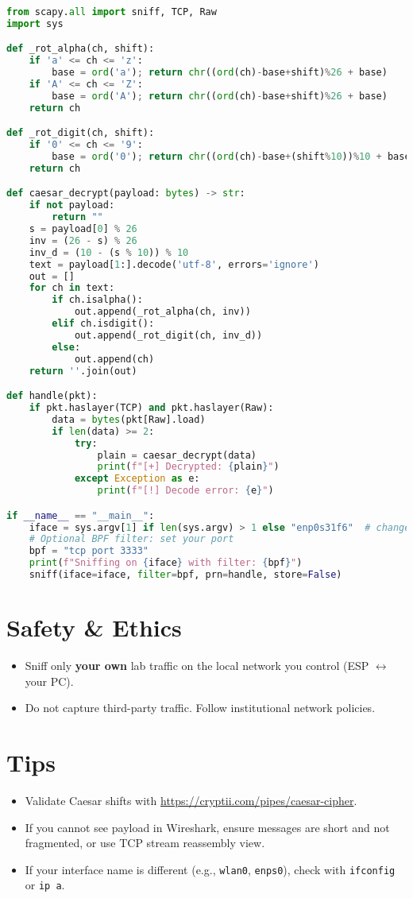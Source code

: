 \documentclass[11pt]{article}
\begin{document}
\begin{lstlisting}[language=Python, caption={sniff_caesar.py (Scapy)}]
from scapy.all import sniff, TCP, Raw
import sys

def _rot_alpha(ch, shift):
    if 'a' <= ch <= 'z':
        base = ord('a'); return chr((ord(ch)-base+shift)%26 + base)
    if 'A' <= ch <= 'Z':
        base = ord('A'); return chr((ord(ch)-base+shift)%26 + base)
    return ch

def _rot_digit(ch, shift):
    if '0' <= ch <= '9':
        base = ord('0'); return chr((ord(ch)-base+(shift%10))%10 + base)
    return ch

def caesar_decrypt(payload: bytes) -> str:
    if not payload:
        return ""
    s = payload[0] % 26
    inv = (26 - s) % 26
    inv_d = (10 - (s % 10)) % 10
    text = payload[1:].decode('utf-8', errors='ignore')
    out = []
    for ch in text:
        if ch.isalpha():
            out.append(_rot_alpha(ch, inv))
        elif ch.isdigit():
            out.append(_rot_digit(ch, inv_d))
        else:
            out.append(ch)
    return ''.join(out)

def handle(pkt):
    if pkt.haslayer(TCP) and pkt.haslayer(Raw):
        data = bytes(pkt[Raw].load)
        if len(data) >= 2:
            try:
                plain = caesar_decrypt(data)
                print(f"[+] Decrypted: {plain}")
            except Exception as e:
                print(f"[!] Decode error: {e}")

if __name__ == "__main__":
    iface = sys.argv[1] if len(sys.argv) > 1 else "enp0s31f6"  # change as needed
    # Optional BPF filter: set your port
    bpf = "tcp port 3333"
    print(f"Sniffing on {iface} with filter: {bpf}")
    sniff(iface=iface, filter=bpf, prn=handle, store=False)
\end{lstlisting}

\section*{Safety \& Ethics}
\begin{itemize}
  \item Sniff only \textbf{your own} lab traffic on the local network you control (ESP \(\leftrightarrow\) your PC).
  \item Do not capture third-party traffic. Follow institutional network policies.
\end{itemize}

\section*{Tips}
\begin{itemize}
  \item Validate Caesar shifts with \url{https://cryptii.com/pipes/caesar-cipher}.
  \item If you cannot see payload in Wireshark, ensure messages are short and not fragmented, or use TCP stream reassembly view.
  \item If your interface name is different (e.g., \texttt{wlan0}, \texttt{enps0}), check with \texttt{ifconfig} or \texttt{ip a}.
\end{itemize}
\end{document}
